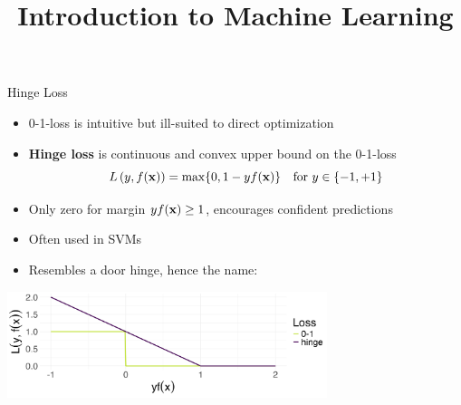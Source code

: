 \documentclass[11pt,compress,t,notes=noshow, xcolor=table]{beamer}
\title{Introduction to Machine Learning}
\begin{document}
    

\begin{vbframe}{Hinge Loss}

\begin{itemize}
  \item 0-1-loss is intuitive but ill-suited to direct optimization
  \item \textbf{Hinge loss} is continuous and convex 
  upper bound on the 0-1-loss 
  $$L\left(y, f(\mathbf{x})\right) = \max \{ 0, 1 - yf(\mathbf{x}) \} \quad \text{for} \ y \in \{-1, +1\}$$
  \item Only zero for margin $yf(\mathbf{x})\geq 1$, 
  encourages confident predictions
  \item Often used in SVMs %
  \item Resembles a door hinge, hence the name:
\end{itemize}

\begin{center}
\includegraphics[width = 0.7\textwidth]{figure/hinge.png}
\end{center}

\end{vbframe}
\end{document}
